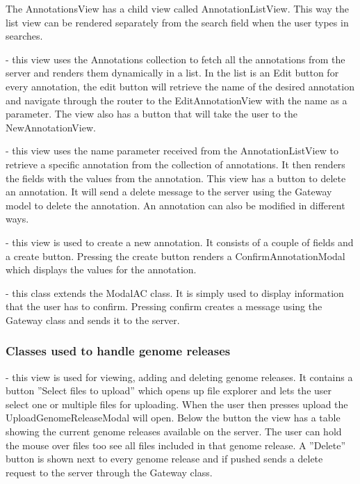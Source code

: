 The AnnotationsView has a child view called AnnotationListView. This way the list view can be rendered separately from the search field when the user types in searches. 

 - this view uses the Annotations collection to fetch all the annotations from the server and renders them dynamically in a list.
In the list is an Edit button for every annotation, the edit button will retrieve the name of the desired annotation and navigate through the router to the EditAnnotationView with the name as a parameter.
The view also has a button that will take the user to the NewAnnotationView.

 - this view uses the name parameter received from the AnnotationListView to retrieve a specific annotation from the collection of annotations. It then renders the fields with the values from the annotation. This view has a button to delete an annotation. It will send a delete message to the server using the Gateway model to delete the annotation. An annotation can also be modified in different ways.

 - this view is used to create a new annotation. It consists of a couple of fields and a create button. Pressing the create button renders a ConfirmAnnotationModal which displays the values for the annotation.

 - this class extends the ModalAC class. It is simply used to display information that the user has to confirm. Pressing confirm creates a message using the Gateway class and sends it to the server.

\subsubsection*{Classes used to handle genome releases}

 - this view is used for viewing, adding and deleting genome releases. It contains a button ''Select files to upload'' which opens up file explorer and lets the user select one or multiple files for uploading. When the user then presses upload the UploadGenomeReleaseModal will open. Below the button the view has a table showing the current genome releases available on the server. The user can hold the mouse over files too see all files included in that genome release. A ''Delete'' button is shown next to every genome release and if pushed sends a delete request to the server through the Gateway class. 

